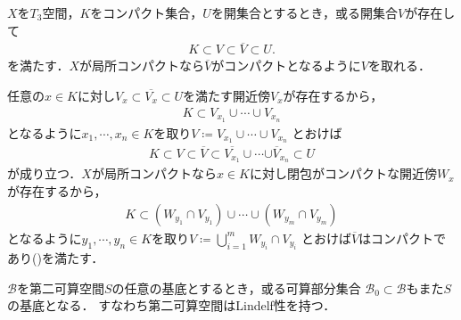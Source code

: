 	\begin{screen}
		\begin{thm}\label{thm:T_3_space}
			$X$を$T_3$空間，$K$をコンパクト集合，$U$を開集合とするとき，或る開集合$V$が存在して
			\begin{align}
				K \subset V \subset \overline{V} \subset U.
				\label{eq:thm_regularity_of_Hausdorff_spaces}
			\end{align}
			を満たす．$X$が局所コンパクトなら$\overline{V}$がコンパクトとなるように$V$を取れる．
		\end{thm}
	\end{screen}
		
	\begin{prf}
		任意の$x \in K$に対し$V_x \subset \overline{V_x} \subset U$を満たす開近傍$V_x$が存在するから，
		\begin{align}
			K \subset V_{x_1} \cup \cdots \cup V_{x_n}
		\end{align}
		となるように$x_1,\cdots,x_n \in K$を取り$V \coloneqq V_{x_1} \cup \cdots \cup V_{x_n}$
		とおけば
		\begin{align}
			K \subset V \subset \overline{V}
			\subset \overline{V_{x_1}} \cup \cdots \overline{\cup V_{x_n}}
			\subset U
		\end{align}
		が成り立つ．$X$が局所コンパクトなら$x \in K$に対し閉包がコンパクトな開近傍$W_x$が存在するから，
		\begin{align}
			K \subset (W_{y_1} \cap V_{y_1}) \cup \cdots \cup (W_{y_m} \cap V_{y_m})
		\end{align}
		となるように$y_1,\cdots,y_n \in K$を取り$V \coloneqq \bigcup_{i=1}^m W_{y_i} \cap V_{y_i}$
		とおけば$\overline{V}$はコンパクトであり()を満たす．
		\QED
	\end{prf}
	
	\begin{screen}
		\begin{thm}[可算コンパクト性の同値条件]
		\end{thm}
	\end{screen}
	
	\begin{screen}
		\begin{thm}[第二可算空間の任意の基底は可算基を内包する]\label{thm:countable_base_of_second_countable_space}
			$\mathscr{B}$を第二可算空間$S$の任意の基底とするとき，或る可算部分集合
			$\mathscr{B}_0 \subset \mathscr{B}$もまた$S$の基底となる．
			すなわち第二可算空間はLindel\Ddot{o}f性を持つ．
		\end{thm}
	\end{screen}
	
